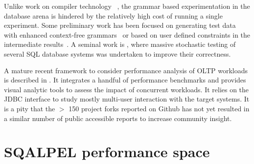 \documentclass{cidr-2019}
\begin{document}
Unlike work on compiler technology
~\cite{McKeeman98differentialtesting}, the grammar based
experimentation in the database arena is hindered by the relatively
high cost of running a single experiment. Some preliminary work has
been focused on generating test data with enhanced context-free
grammars~\cite{10.1007/978-3-319-11245-9_19} or based on user defined
constraints in the intermediate
results~\cite{Binnig:2007:QGQ:1247480.1247520}. A seminal work is
\cite{DBLP:conf/vldb/Slutz98}, where massive stochastic testing of
several SQL database systems was undertaken to improve their
correctness.

A mature recent framework to consider performance analysis of OLTP workloads
is described in \cite{DBLP:journals/pvldb/DifallahPCC13}. It integrates a handful of performance
benchmarks and provides visual analytic tools to assess the impact of concurrent workloads. 
It relies on the JDBC interface to study mostly multi-user
interaction with the target systems. It is a pity that the $>$ 150 project forks reported 
on Github has not yet resulted in a similar number of public accessible reports to increase community insight.





\section{SQALPEL performance space}\label{overview}
\end{document}
